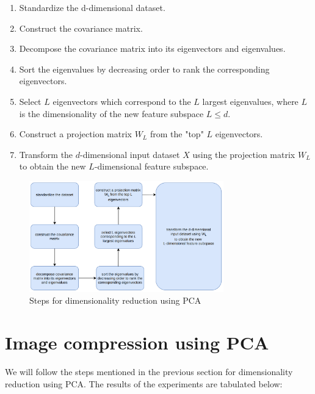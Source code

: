 \begin{enumerate}
    \item Standardize the d-dimensional dataset.
    \item Construct the covariance matrix.
    \item Decompose the covariance matrix into its eigenvectors and eigenvalues.
    \item Sort the eigenvalues by decreasing order to rank the corresponding eigenvectors.
    \item Select $L$ eigenvectors which correspond to the $L$ largest eigenvalues, where $L$ is the dimensionality of the new feature subspace $L \leq d$.
    \item Construct a projection matrix $W_L$ from the "top" $L$ eigenvectors.
    \item Transform the $d$-dimensional input dataset $X$ using the projection matrix $W_L$ to obtain the new $L$-dimensional feature subspace.
\end{enumerate}

\vspace{1em}

\begin{figure}[!ht]
    \centering
    \includegraphics[width=0.75\textwidth]{fig/2-3.png}
    \caption{Steps for dimensionality reduction using PCA}
    \label{fig:dimensionalityReductionSteps}
\end{figure}

\vspace{1em}

\section{Image compression using PCA}

We will follow the steps mentioned in the previous section for dimensionality reduction using PCA. The results of the experiments are tabulated below:


